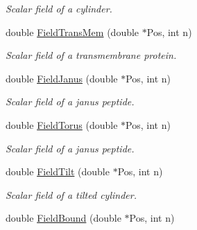 \begin{DoxyCompactItemize}
\begin{DoxyCompactList}\small\item\em Scalar field of a cylinder. \end{DoxyCompactList}\item 
double \hyperlink{classVarData_a9d9191dee4d541b9879c24a00fd0a834}{Field\+Trans\+Mem} (double $\ast$Pos, int n)\hypertarget{classVarData_a9d9191dee4d541b9879c24a00fd0a834}{}\label{classVarData_a9d9191dee4d541b9879c24a00fd0a834}

\begin{DoxyCompactList}\small\item\em Scalar field of a transmembrane protein. \end{DoxyCompactList}\item 
double \hyperlink{classVarData_a46e51009369b146f3a742f86e5161ddf}{Field\+Janus} (double $\ast$Pos, int n)\hypertarget{classVarData_a46e51009369b146f3a742f86e5161ddf}{}\label{classVarData_a46e51009369b146f3a742f86e5161ddf}

\begin{DoxyCompactList}\small\item\em Scalar field of a janus peptide. \end{DoxyCompactList}\item 
double \hyperlink{classVarData_aa4f434e91f7eb95a1367c12d0bccf2b4}{Field\+Torus} (double $\ast$Pos, int n)\hypertarget{classVarData_aa4f434e91f7eb95a1367c12d0bccf2b4}{}\label{classVarData_aa4f434e91f7eb95a1367c12d0bccf2b4}

\begin{DoxyCompactList}\small\item\em Scalar field of a janus peptide. \end{DoxyCompactList}\item 
double \hyperlink{classVarData_acf4dca72902c52130df7a72568b038d7}{Field\+Tilt} (double $\ast$Pos, int n)\hypertarget{classVarData_acf4dca72902c52130df7a72568b038d7}{}\label{classVarData_acf4dca72902c52130df7a72568b038d7}

\begin{DoxyCompactList}\small\item\em Scalar field of a tilted cylinder. \end{DoxyCompactList}\item 
double \hyperlink{classVarData_a15167b970b637f6e42a37ac72baaea87}{Field\+Bound} (double $\ast$Pos, int n)\hypertarget{classVarData_a15167b970b637f6e42a37ac72baaea87}{}\label{classVarData_a15167b970b637f6e42a37ac72baaea87}


\end{DoxyCompactItemize}
